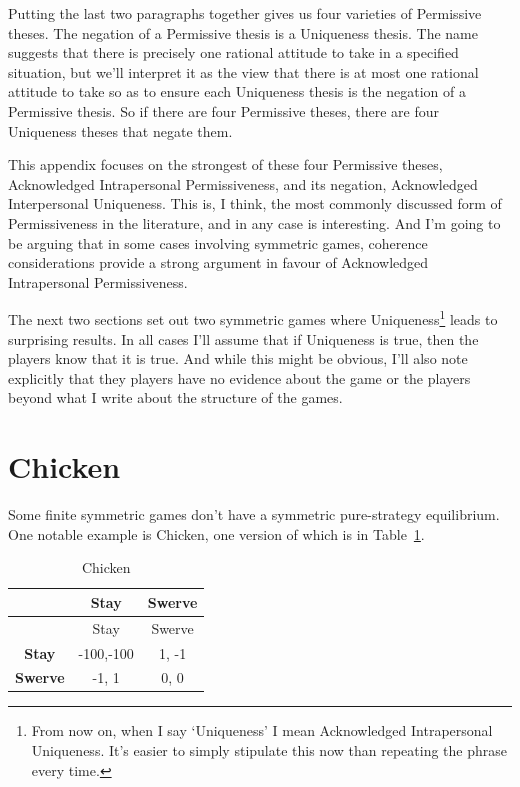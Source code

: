 \documentclass[
  12pt,
  letterpaper,
  DIV=11,
  numbers=noendperiod]{scrreprt}
\begin{document}
Putting the last two paragraphs together gives us four varieties of
Permissive theses. The negation of a Permissive thesis is a Uniqueness
thesis. The name suggests that there is precisely one rational attitude
to take in a specified situation, but we'll interpret it as the view
that there is at most one rational attitude to take so as to ensure each
Uniqueness thesis is the negation of a Permissive thesis. So if there
are four Permissive theses, there are four Uniqueness theses that negate
them.

This appendix focuses on the strongest of these four Permissive theses,
Acknowledged Intrapersonal Permissiveness, and its negation,
Acknowledged Interpersonal Uniqueness. This is, I think, the most
commonly discussed form of Permissiveness in the literature, and in any
case is interesting. And I'm going to be arguing that in some cases
involving symmetric games, coherence considerations provide a strong
argument in favour of Acknowledged Intrapersonal Permissiveness.

The next two sections set out two symmetric games where
Uniqueness\footnote{From now on, when I say `Uniqueness' I mean
  Acknowledged Intrapersonal Uniqueness. It's easier to simply stipulate
  this now than repeating the phrase every time.} leads to surprising
results. In all cases I'll assume that if Uniqueness is true, then the
players know that it is true. And while this might be obvious, I'll also
note explicitly that they players have no evidence about the game or the
players beyond what I write about the structure of the games.

\hypertarget{chicken}{%
\section{Chicken}\label{chicken}}

Some finite symmetric games don't have a symmetric pure-strategy
equilibrium. One notable example is Chicken, one version of which is in
Table~\ref{tbl-unique-chicken}.

\hypertarget{tbl-unique-chicken}{}
\begin{longtable}[]{@{}ccc@{}}
\caption{\label{tbl-unique-chicken}Chicken}\tabularnewline
\toprule\noalign{}
& Stay & Swerve \\
\midrule\noalign{}
\endfirsthead
\toprule\noalign{}
& Stay & Swerve \\
\midrule\noalign{}
\endhead
\bottomrule\noalign{}
\endlastfoot
\textbf{Stay} & -100,-100 & 1, -1 \\
\textbf{Swerve} & -1, 1 & 0, 0 \\
\end{longtable}
\end{document}
